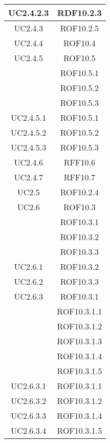 \begin{longtable}{|c|c|}
\midrule
UC2.4.2.3
& RDF10.2.3\\

\midrule
UC2.4.3
& ROF10.2.5\\

\midrule
UC2.4.4
& ROF10.4\\

\midrule
UC2.4.5
& ROF10.5\\
& ROF10.5.1\\
& ROF10.5.2\\
& ROF10.5.3\\

\midrule
UC2.4.5.1
& ROF10.5.1\\

\midrule
UC2.4.5.2
& ROF10.5.2\\

\midrule
UC2.4.5.3
& ROF10.5.3\\

\midrule
UC2.4.6
& RFF10.6\\

\midrule
UC2.4.7
& RFF10.7\\

\midrule
UC2.5
& ROF10.2.4\\

\midrule
UC2.6
& ROF10.3\\
& ROF10.3.1\\
& ROF10.3.2\\
& ROF10.3.3\\

\midrule
UC2.6.1
& ROF10.3.2\\

\midrule
UC2.6.2
& ROF10.3.3\\

\midrule
UC2.6.3
& ROF10.3.1\\
& ROF10.3.1.1\\
& ROF10.3.1.2\\
& ROF10.3.1.3\\
& ROF10.3.1.4\\
& ROF10.3.1.5\\

\midrule
UC2.6.3.1
& ROF10.3.1.1\\

\midrule
UC2.6.3.2
& ROF10.3.1.2\\

\midrule
UC2.6.3.3
& ROF10.3.1.4\\

\midrule
UC2.6.3.4
& ROF10.3.1.5\\


\end{longtable}
